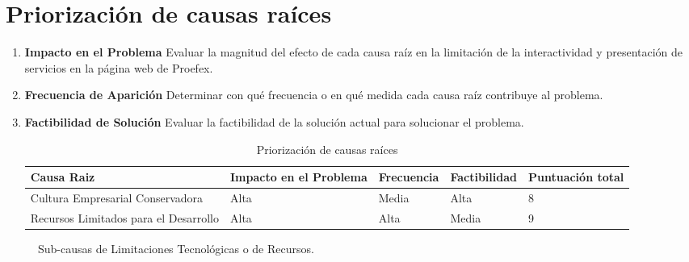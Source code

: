 \section{Priorización de causas raíces}

\begin{enumerate}
\item \textbf{Impacto en el Problema}
Evaluar la magnitud del efecto de cada causa raíz en la limitación de la interactividad
y presentación de servicios en la página web de Proefex.

\item \textbf{Frecuencia de Aparición}
Determinar con qué frecuencia o en qué medida cada causa raíz contribuye al problema.

\item \textbf{Factibilidad de Solución}
Evaluar la factibilidad de la solución actual para solucionar el problema.

\begin{table}[!ht]
\begin{center}
\begin{tabular}{| p{4cm} | p{3cm} | p{2cm} | p{2cm} | p{2cm} | }
\hline
Causa Raiz & Impacto en el Problema & Frecuencia & Factibilidad & Puntuación total \\ \hline
Cultura Empresarial Conservadora & Alta & Media & Alta & 8 \\ \hline
Recursos Limitados para el Desarrollo & Alta & Alta & Media & 9 \\ \hline
\end{tabular}

\caption{Priorización de causas raíces}
\label{tab:causasraiz}
\end{center}
\end{table} 
\end{enumerate}

\begin{figure}[ht]
  \centering
  \caption{Sub-causas de Limitaciones Tecnológicas o de Recursos.}
\end{figure}

